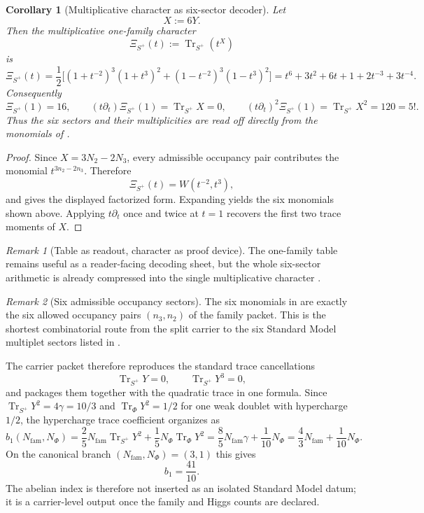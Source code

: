 \documentclass[11pt,a4paper]{article}
\newtheorem{corollary}[theorem]{Corollary}
\theoremstyle{definition}
\theoremstyle{remark}
\newtheorem*{remark}{Remark}
\DeclareMathOperator{\tr}{Tr}
\newcommand{\bone}{b_1}
\begin{document}
\begin{corollary}[Multiplicative character as six-sector decoder]
\label{cor:multiplicative-family-character}
Let
\[
X:=6Y.
\]
Then the multiplicative one-family character
\[
\Xi_{S^+}(t):=\tr_{S^+}(t^X)
\]
is
\begin{equation}
\label{eq:multiplicative-family-character}
\Xi_{S^+}(t)
=
\frac12\Big[
(1+t^{-2})^3(1+t^3)^2
+
(1-t^{-2})^3(1-t^3)^2
\Big]
=
t^6+3t^2+6t+1+2t^{-3}+3t^{-4}.
\end{equation}
Consequently
\[
\Xi_{S^+}(1)=16,
\qquad
(t\partial_t)\Xi_{S^+}(1)=\tr_{S^+}X=0,
\qquad
(t\partial_t)^2\Xi_{S^+}(1)=\tr_{S^+}X^2=120=5!.
\]
Thus the six sectors and their multiplicities are read off directly from the monomials of
.
\end{corollary}

\begin{proof}
Since $X=3N_2-2N_3$, every admissible occupancy pair contributes the monomial
$t^{3n_2-2n_3}$. Therefore
\[
\Xi_{S^+}(t)=W(t^{-2},t^3),
\]
and  gives the displayed factorized form. Expanding yields the six
monomials shown above. Applying $t\partial_t$ once and twice at $t=1$ recovers the first two trace
moments of $X$.
\end{proof}

\begin{remark}[Table as readout, character as proof device]
The one-family table remains useful as a reader-facing decoding sheet, but the whole six-sector
arithmetic is already compressed into the single multiplicative character
.
\end{remark}

\begin{remark}[Six admissible occupancy sectors]
The six monomials in  are exactly the six allowed occupancy pairs $(n_3,n_2)$ of the family packet. This is the shortest combinatorial route from the split carrier to the six Standard Model multiplet sectors listed in .
\end{remark}

The carrier packet therefore reproduces the standard trace cancellations
\[
\tr_{S^+}Y=0,
\qquad
\tr_{S^+}Y^3=0,
\]
and packages them together with the quadratic trace in one formula. Since $\tr_{S^+}Y^2=4\gamma=10/3$ and $\tr_\Phi Y^2=1/2$ for one weak doublet with hypercharge $1/2$, the hypercharge trace coefficient organizes as
\begin{equation}
\label{eq:abelian-index}
\bone(N_{\mathrm{fam}},N_\Phi)
=
\frac25N_{\mathrm{fam}}\tr_{S^+}Y^2+\frac15N_\Phi\tr_\Phi Y^2
=
\frac85N_{\mathrm{fam}}\gamma+\frac1{10}N_\Phi
=
\frac43N_{\mathrm{fam}}+\frac1{10}N_\Phi.
\end{equation}
On the canonical branch $(N_{\mathrm{fam}},N_\Phi)=(3,1)$ this gives
\[
\bone=\frac{41}{10}.
\]
The abelian index is therefore not inserted as an isolated Standard Model datum; it is a carrier-level output once the family and Higgs counts are declared.
\end{document}
